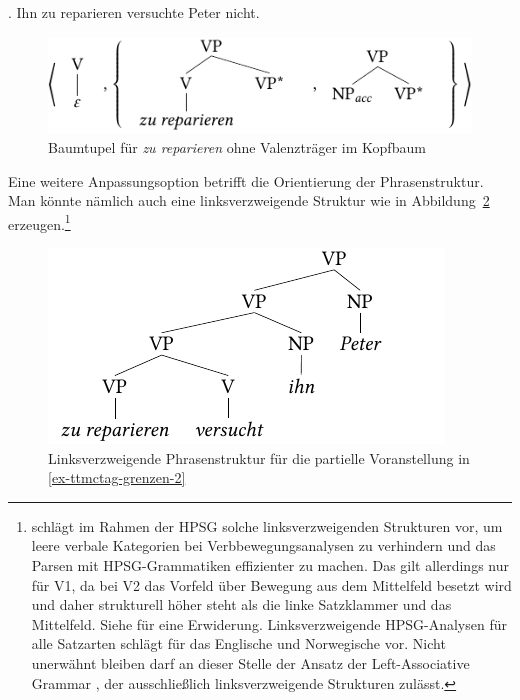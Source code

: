 \ex. Ihn zu reparieren versuchte Peter nicht. \label{ex-ttmctag-grenzen-ii-2}  

\begin{figure}[t]
\centering
\includegraphics{graphics/abb734.pdf}
\caption{\label{fig-ttmctag-grenzen-ii-4}Baumtupel für {\it zu reparieren} ohne Valenzträger im Kopfbaum}
\end{figure}

Eine weitere Anpassungsoption betrifft die Orientierung der Phrasenstruktur. Man könnte nämlich auch eine linksverzweigende Struktur wie in Abbildung~\ref{fig-ttmctag-ii-5} erzeugen.\footnote{\cite{Crysmann:03} schlägt im Rahmen der HPSG solche linksverzweigenden Strukturen vor, um leere verbale Kategorien bei Verbbewegungsanalysen zu verhindern und das Parsen mit HPSG-Grammatiken effizienter zu machen. Das gilt allerdings nur für V1, da bei V2 das Vorfeld über Bewegung aus dem Mittelfeld besetzt wird und daher strukturell höher steht als die linke Satzklammer und das Mittelfeld. Siehe \cite{Mueller:05} für eine Erwiderung. Linksverzweigende HPSG-Analysen für alle Satzarten schlägt \cite{Haugereid:09} für das Englische und Norwegische vor. Nicht unerwähnt bleiben darf an dieser Stelle der Ansatz der Left-Associative Grammar \citep{Hausser:89}, der ausschließlich linksverzweigende Strukturen zulässt.}
\begin{figure}[t]
\centering
\includegraphics{graphics/abb735.pdf}
\caption{\label{fig-ttmctag-ii-5}Linksverzweigende Phrasenstruktur für die partielle Voranstellung in \ref{ex-ttmctag-grenzen-2} }
\end{figure}

